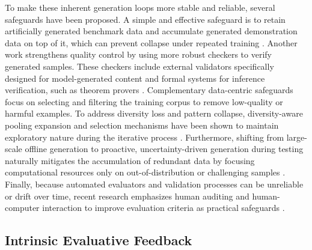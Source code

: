 To make these inherent generation loops more stable and reliable, several safeguards have been proposed. A simple and effective safeguard is to retain artificially generated benchmark data and accumulate generated demonstration data on top of it, which can prevent collapse under repeated training \citep{gerstgrasser2024is}. Another work strengthens quality control by using more robust checkers to verify generated samples. These checkers include external validators specifically designed for model-generated content \citep{yi2025escapingmodelcollapsesynthetic} and formal systems for inference verification, such as theorem provers \citep{Leang_2025}. Complementary data-centric safeguards focus on selecting and filtering the training corpus to remove low-quality or harmful examples. To address diversity loss and pattern collapse, diversity-aware pooling expansion and selection mechanisms have been shown to maintain exploratory nature during the iterative process \citep{qin2025dive}. Furthermore, shifting from large-scale offline generation to proactive, uncertainty-driven generation during testing naturally mitigates the accumulation of redundant data by focusing computational resources only on out-of-distribution or challenging samples \citep{acikgoz2025selfimprovingllmagentstesttime}. Finally, because automated evaluators and validation processes can be unreliable or drift over time, recent research emphasizes human auditing and human-computer interaction to improve evaluation criteria as practical safeguards \citep{10.1145/3731120.3744588, do2025generateevaluateiteratesynthetic}.



\subsection{Intrinsic Evaluative Feedback}
\label{sec:Intrinsic_Evaluative_Feedback}
\label{sec:Self_Generated_Supervision}


